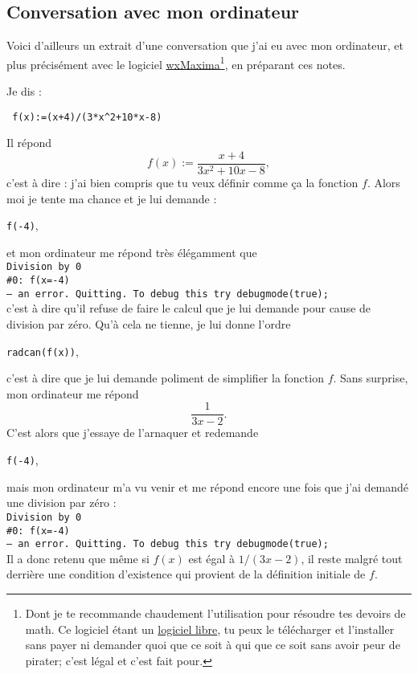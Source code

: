 \subsection{Conversation avec mon ordinateur}

Voici d'ailleurs un extrait d'une conversation que j'ai eu avec mon ordinateur, et plus précisément avec le logiciel \href{http://fr.wikipedia.org/wiki/Maxima}{wxMaxima}\footnote{Dont je te recommande chaudement l'utilisation pour résoudre tes devoirs de math. Ce logiciel étant un \href{http://fr.wikipedia.org/wiki/Logiciel_libre}{logiciel libre}, tu peux le télécharger et l'installer sans payer ni demander quoi que ce soit à qui que ce soit sans avoir peur de pirater; c'est légal et c'est fait pour.}, en préparant ces notes.

Je dis :
\begin{center}
\texttt{ f(x)\!:=(x+4)/(3*x\textasciicircum 2+10*x-8)}
\end{center}
Il répond
\begin{equation}		\label{EqOrdiRefuse}
  f(x):= \frac{ x+4 }{ 3x^2+10x-8 },
\end{equation}
c'est à dire : \og j'ai bien compris que tu veux définir comme ça la fonction $f$\fg. Alors moi je tente ma chance et je lui demande :
\begin{center}
\texttt{f(-4)},
\end{center}
et mon ordinateur me répond très élégamment que\\
\texttt{Division by 0\\ \#0: f(x=-4)\\-- an error. Quitting. To debug this try debugmode(true);\\}
c'est à dire qu'il refuse de faire le calcul que je lui demande pour cause de division par zéro. Qu'à cela ne tienne, je lui donne l'ordre
\begin{center}
\texttt{radcan(f(x))},
\end{center}
 c'est à dire que je lui demande poliment de simplifier la fonction $f$. Sans surprise, mon ordinateur me répond
\[ 
  \frac{ 1 }{ 3x-2 }.
\]
C'est alors que j'essaye de l'arnaquer et redemande
\begin{center}
\texttt{f(-4)},
\end{center}
mais mon ordinateur m'a vu venir et me répond encore une fois que j'ai demandé une division par zéro :\\
\texttt{Division by 0\\ \#0: f(x=-4)\\-- an error. Quitting. To debug this try debugmode(true);\\}
Il a donc retenu que même si $f(x)$ est égal à $1/(3x-2)$, il reste malgré tout derrière une condition d'existence qui provient de la définition initiale de $f$.

